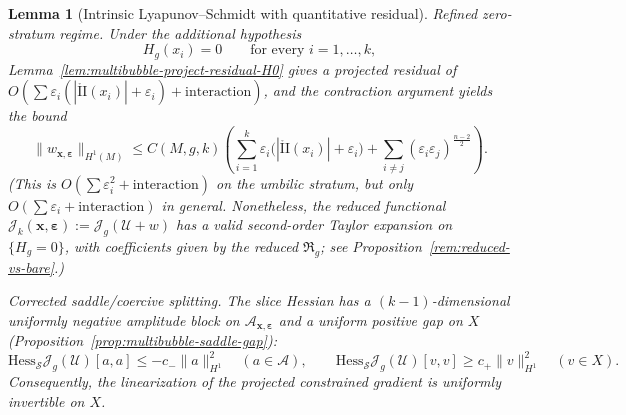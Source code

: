 \documentclass[11pt,reqno,a4paper]{amsart}
\numberwithin{equation}{section}
\theoremstyle{plain}
\newtheorem{lemma}[theorem]{Lemma}
\theoremstyle{remark}
\theoremstyle{plain}
\begin{document}
\begin{lemma}[Intrinsic Lyapunov--Schmidt with quantitative residual]
\smallskip
\noindent\emph{Refined zero-stratum regime.}
Under the additional hypothesis
\begin{equation}\label{eq:LS-refined-hyp}
H_g(x_i)=0\qquad\text{for every }i=1,\dots,k,
\end{equation}
Lemma~\ref{lem:multibubble-project-residual-H0} gives a projected residual of
$O(\sum\varepsilon_i(|\mathring{\mathrm{II}}(x_i)|+\varepsilon_i)+\text{interaction})$,
and the contraction argument yields the bound
\begin{equation}\label{eq:LS-w-bound-refined}
\|w_{\mathbf x,\boldsymbol\varepsilon}\|_{H^1(M)}
\le
C(M,g,k)\left(
\sum_{i=1}^k \varepsilon_i\big(|\mathring{\mathrm{II}}(x_i)|+\varepsilon_i\big)
+
\sum_{i\ne j}(\varepsilon_i\varepsilon_j)^{\frac{n-2}{2}}
\right).
\end{equation}
(This is $O(\sum\varepsilon_i^2+\text{interaction})$ on the umbilic stratum, but only
$O(\sum\varepsilon_i+\text{interaction})$ in general.
Nonetheless, the \emph{reduced functional} $\mathcal J_k(\mathbf x,\boldsymbol\varepsilon):=\mathcal J_g(\mathcal U+w)$ has a
valid second-order Taylor expansion on $\{H_g=0\}$, with coefficients given by the reduced
$\mathfrak R_g$; see Proposition~\ref{rem:reduced-vs-bare}.)

\smallskip
\noindent\emph{Corrected saddle/coercive splitting.}
The slice Hessian has a $(k-1)$-dimensional uniformly negative amplitude block on
$\mathcal A_{\mathbf x,\boldsymbol\varepsilon}$ and a uniform positive gap on $X$
(Proposition~\ref{prop:multibubble-saddle-gap}):
\[
\mathrm{Hess}_{\mathcal S}\mathcal J_g(\mathcal U)[a,a]
\le -c_-\|a\|_{H^1}^2\quad(a\in\mathcal A),
\qquad
\mathrm{Hess}_{\mathcal S}\mathcal J_g(\mathcal U)[v,v]
\ge c_+\|v\|_{H^1}^2\quad(v\in X).
\]
Consequently, the linearization of the projected constrained gradient is uniformly invertible on $X$.
\end{lemma}
\end{document}
